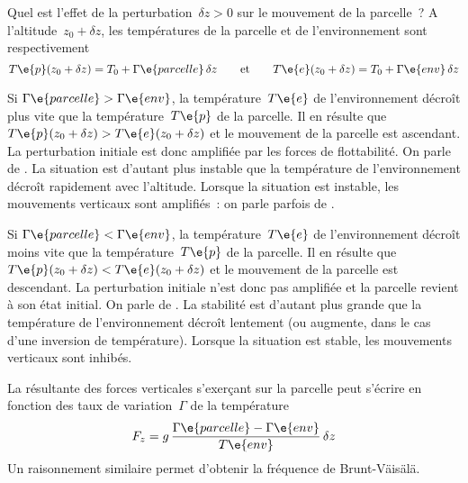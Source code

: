 \sk
Quel est l'effet de la perturbation~$\delta z > 0$ sur le mouvement de la parcelle~? A l'altitude~$z_0 + \delta z$, les températures de la parcelle et de l'environnement sont respectivement
\[ T\e{p}(z_0 + \delta z) = T_0 + \Gamma\e{parcelle} \, \delta z 
\qquad \text{et} \qquad
T\e{e}(z_0 + \delta z) = T_0 + \Gamma\e{env} \, \delta z \]
\begin{finger}
\item Si $\Gamma\e{parcelle} > \Gamma\e{env}$, la température~$T\e{e}$ de l'environnement décroît plus vite que la température~$T\e{p}$ de la parcelle. Il en résulte que~$T\e{p}(z_0 + \delta z) > T\e{e}(z_0 + \delta z)$ et le mouvement de la parcelle est ascendant. La perturbation initiale est donc amplifiée par les forces de flottabilité. On parle de . La situation est d'autant plus instable que la température de l'environnement décroît rapidement avec l'altitude. Lorsque la situation est instable, les mouvements verticaux sont amplifiés~: on parle parfois de .
\item Si $\Gamma\e{parcelle} < \Gamma\e{env}$, la température~$T\e{e}$ de l'environnement décroît moins vite que la température~$T\e{p}$ de la parcelle. Il en résulte que~$T\e{p}(z_0 + \delta z) < T\e{e}(z_0 + \delta z)$ et le mouvement de la parcelle est descendant. La perturbation initiale n'est donc pas amplifiée et la parcelle revient à son état initial. On parle de . La stabilité est d'autant plus grande que la température de l'environnement décroît lentement (ou augmente, dans le cas d'une inversion de température). Lorsque la situation est stable, les mouvements verticaux sont inhibés.
\end{finger}
La résultante des forces verticales s'exerçant sur la parcelle peut s'écrire en fonction des taux de variation~$\Gamma$ de la température
\[ F_z = g \, \frac{\Gamma\e{parcelle}-\Gamma\e{env}}{T\e{env}} \, \delta z \]
\noindent Un raisonnement similaire permet d'obtenir la fréquence de Brunt-V{\"a}is{\"a}l{\"a}.

